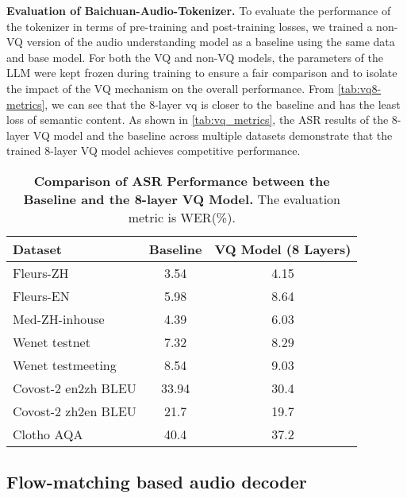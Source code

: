 \textbf{Evaluation of Baichuan-Audio-Tokenizer.}
To evaluate the performance of the tokenizer in terms of pre-training and post-training losses, we trained a non-VQ version of the audio understanding model as a baseline using the same data and base model. For both the VQ and non-VQ models, the parameters of the LLM were kept frozen during training to ensure a fair comparison and to isolate the impact of the VQ mechanism on the overall performance. From \autoref{tab:vq8-metrics}, we can see that the 8-layer vq is closer to the baseline and has the least loss of semantic content. As shown in \autoref{tab:vq_metrics}, the ASR results of the 8-layer VQ model and the baseline across multiple datasets demonstrate that the trained 8-layer VQ model achieves competitive performance.


\begin{table}[ht]
    \caption{\textbf{Comparison of ASR Performance between the Baseline and the 8-layer VQ Model.} The evaluation metric is WER(\%).}
    \centering
    \renewcommand{\arraystretch}{1.2}
    \begin{tabular}{lcc}
        \hline
        \textbf{Dataset} & \textbf{Baseline} & \textbf{VQ Model (8 Layers)} \\
        \hline
        Fleurs-ZH & 3.54 & 4.15 \\
        Fleurs-EN & 5.98 & 8.64 \\
        Med-ZH-inhouse & 4.39 & 6.03 \\
        Wenet testnet & 7.32 & 8.29 \\
        Wenet testmeeting & 8.54 & 9.03 \\
        Covost-2 en2zh BLEU & 33.94 & 30.4 \\
        Covost-2 zh2en BLEU & 21.7 & 19.7 \\
        Clotho AQA & 40.4 & 37.2 \\
        \hline
    \end{tabular}
    \label{tab:vq_metrics}
\end{table}
\subsection{Flow-matching based audio decoder}



